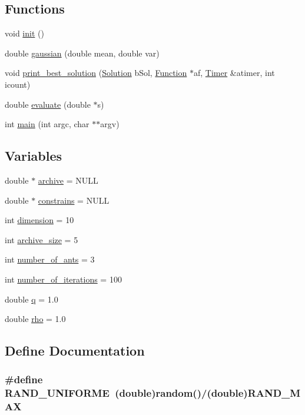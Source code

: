 \subsection*{Functions}
\begin{CompactItemize}
\item 
void \hyperlink{aco-r_8cpp_02fd73d861ef2e4aabb38c0c9ff82947}{init} ()
\item 
double \hyperlink{aco-r_8cpp_c49c8f28940eb73a2d3c5d4f54a77acb}{gaussian} (double mean, double var)
\item 
void \hyperlink{aco-r_8cpp_cec77708e3d6f73a14c252e8747c11b1}{print\_\-best\_\-solution} (\hyperlink{classSolution}{Solution} bSol, \hyperlink{classFunction}{Function} $\ast$af, \hyperlink{classTimer}{Timer} \&atimer, int icount)
\item 
double \hyperlink{aco-r_8cpp_c5992296530c3f2c91fb35345606b029}{evaluate} (double $\ast$s)
\item 
int \hyperlink{aco-r_8cpp_3c04138a5bfe5d72780bb7e82a18e627}{main} (int argc, char $\ast$$\ast$argv)
\end{CompactItemize}
\subsection*{Variables}
\begin{CompactItemize}
\item 
double $\ast$ \hyperlink{aco-r_8cpp_a0e91b6673e0f6c62ed362a35d18064e}{archive} = NULL
\item 
double $\ast$ \hyperlink{aco-r_8cpp_68e32a83dbc9e45c0eca86384c297aba}{constrains} = NULL
\item 
int \hyperlink{aco-r_8cpp_1a8a8235879363159315091a1daed72f}{dimension} = 10
\item 
int \hyperlink{aco-r_8cpp_ae8c272782ff802dd95092adf15f474e}{archive\_\-size} = 5
\item 
int \hyperlink{aco-r_8cpp_346cfde20df32ef1244e37b7de85f5a3}{number\_\-of\_\-ants} = 3
\item 
int \hyperlink{aco-r_8cpp_77d5d27d8fdf89eb369e3bae9e6e752d}{number\_\-of\_\-iterations} = 100
\item 
double \hyperlink{aco-r_8cpp_5b5e3f03e443adea974601f295136638}{q} = 1.0
\item 
double \hyperlink{aco-r_8cpp_3ed57096651b587c2bf716fa78048153}{rho} = 1.0
\end{CompactItemize}


\subsection{Define Documentation}
\hypertarget{aco-r_8cpp_523b1c70fbff9e4e25f29b323bead209}{
\subsubsection{\setlength{\rightskip}{0pt plus 5cm}\#define RAND\_\-UNIFORME~(double)random()/(double)RAND\_\-MAX}}
\label{aco-r_8cpp_523b1c70fbff9e4e25f29b323bead209}





